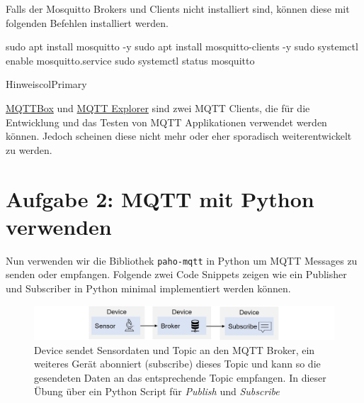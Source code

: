 \documentclass[
  11pt,
  a4paperpaper,
  oneside, openany  ,captions=tableheading
]{scrbook}
\newenvironment{Shaded}{\begin{snugshade}}{\end{snugshade}}
\newcommand{\AttributeTok}[1]{\textcolor[rgb]{0.40,0.45,0.13}{#1}}
\newcommand{\FunctionTok}[1]{\textcolor[rgb]{0.28,0.35,0.67}{#1}}
\newcommand{\NormalTok}[1]{\textcolor[rgb]{0.00,0.23,0.31}{#1}}
\theoremstyle{definition}
\theoremstyle{remark}
\begin{document}
Falls der Mosquitto Brokers und Clients nicht installiert sind, können
diese mit folgenden Befehlen installiert werden.

\begin{Shaded}
\begin{Highlighting}[]
\FunctionTok{sudo}\NormalTok{ apt install mosquitto }\AttributeTok{{-}y}
\FunctionTok{sudo}\NormalTok{ apt install mosquitto{-}clients }\AttributeTok{{-}y}
\FunctionTok{sudo}\NormalTok{ systemctl enable mosquitto.service}
\FunctionTok{sudo}\NormalTok{ systemctl status mosquitto}
\end{Highlighting}
\end{Shaded}

\begin{boxtitle}{Hinweis}{colPrimary}

\href{https://apps.microsoft.com/detail/9NBLGGH55JZG}{MQTTBox} und
\href{https://mqtt-explorer.com}{MQTT Explorer} sind zwei MQTT Clients,
die für die Entwicklung und das Testen von MQTT Applikationen verwendet
werden können. Jedoch scheinen diese nicht mehr oder eher sporadisch
weiterentwickelt zu werden.

\end{boxtitle}

\section{Aufgabe 2: MQTT mit Python
verwenden}\label{aufgabe-2-mqtt-mit-python-verwenden}

Nun verwenden wir die Bibliothek \texttt{paho-mqtt} in Python um MQTT
Messages zu senden oder empfangen. Folgende zwei Code Snippets zeigen
wie ein Publisher und Subscriber in Python minimal implementiert werden
können.

\begin{figure}[H]

{\centering \includegraphics{images/mqtt-sensor-subscribe.jpg}

}

\caption{Device sendet Sensordaten und Topic an den MQTT Broker, ein
weiteres Gerät abonniert (subscribe) dieses Topic und kann so die
gesendeten Daten an das entsprechende Topic empfangen. In dieser Übung
über ein Python Script für \emph{Publish} und \emph{Subscribe}}

\end{figure}%
\end{document}
